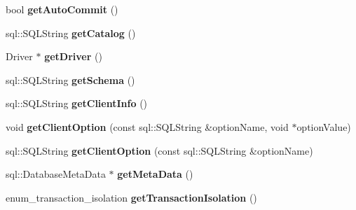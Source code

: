 \begin{DoxyCompactItemize}
\item 
bool {\bfseries get\+Auto\+Commit} ()\hypertarget{classsql_1_1mysql_1_1MySQL__Connection_aa8a7c0dfd9b9dd7f8c00c43fefa2f8a4}{}\label{classsql_1_1mysql_1_1MySQL__Connection_aa8a7c0dfd9b9dd7f8c00c43fefa2f8a4}

\item 
sql\+::\+S\+Q\+L\+String {\bfseries get\+Catalog} ()\hypertarget{classsql_1_1mysql_1_1MySQL__Connection_af410a283060804936031001d38f89e9b}{}\label{classsql_1_1mysql_1_1MySQL__Connection_af410a283060804936031001d38f89e9b}

\item 
Driver $\ast$ {\bfseries get\+Driver} ()\hypertarget{classsql_1_1mysql_1_1MySQL__Connection_af4aaa6f7a2564e6cd7b259a24fe8f0ef}{}\label{classsql_1_1mysql_1_1MySQL__Connection_af4aaa6f7a2564e6cd7b259a24fe8f0ef}

\item 
sql\+::\+S\+Q\+L\+String {\bfseries get\+Schema} ()\hypertarget{classsql_1_1mysql_1_1MySQL__Connection_a49bf51d2c4586f8f85c362a6c71cf8b6}{}\label{classsql_1_1mysql_1_1MySQL__Connection_a49bf51d2c4586f8f85c362a6c71cf8b6}

\item 
sql\+::\+S\+Q\+L\+String {\bfseries get\+Client\+Info} ()\hypertarget{classsql_1_1mysql_1_1MySQL__Connection_aa94814c22d27fae1f62f8a077619026c}{}\label{classsql_1_1mysql_1_1MySQL__Connection_aa94814c22d27fae1f62f8a077619026c}

\item 
void {\bfseries get\+Client\+Option} (const sql\+::\+S\+Q\+L\+String \&option\+Name, void $\ast$option\+Value)\hypertarget{classsql_1_1mysql_1_1MySQL__Connection_a0c80ccabb9723fc4e7bcbe1fac2b7cbf}{}\label{classsql_1_1mysql_1_1MySQL__Connection_a0c80ccabb9723fc4e7bcbe1fac2b7cbf}

\item 
sql\+::\+S\+Q\+L\+String {\bfseries get\+Client\+Option} (const sql\+::\+S\+Q\+L\+String \&option\+Name)\hypertarget{classsql_1_1mysql_1_1MySQL__Connection_a6aa6995181dd5acfa0c18ec7917d2d02}{}\label{classsql_1_1mysql_1_1MySQL__Connection_a6aa6995181dd5acfa0c18ec7917d2d02}

\item 
sql\+::\+Database\+Meta\+Data $\ast$ {\bfseries get\+Meta\+Data} ()\hypertarget{classsql_1_1mysql_1_1MySQL__Connection_a5fcfd3fa9932acb64c36d49c0e264e95}{}\label{classsql_1_1mysql_1_1MySQL__Connection_a5fcfd3fa9932acb64c36d49c0e264e95}

\item 
enum\+\_\+transaction\+\_\+isolation {\bfseries get\+Transaction\+Isolation} ()\hypertarget{classsql_1_1mysql_1_1MySQL__Connection_a556dcab3c0deb14fde548a270d9168ad}{}\label{classsql_1_1mysql_1_1MySQL__Connection_a556dcab3c0deb14fde548a270d9168ad}


\end{DoxyCompactItemize}

